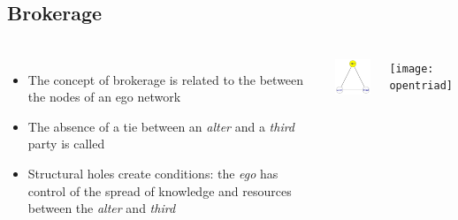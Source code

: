 \documentclass[8pt]{beamer}
\begin{document}
\subsection{Brokerage}

\begin{frame}
\frametitle{\insertsection}
\framesubtitle{\insertsubsection}

\begin{columns}

\begin{itemize}
\item The concept of brokerage is related to the {\color{blue}{absence of ties}} between the nodes of an ego network
\item The absence of a tie between an \textit{alter} and a \textit{third} party is called {\color{blue}{structural hole}}
\item Structural holes create {\color{blue}{tertius gaudens}} conditions: the \textit{ego} has control of the spread of knowledge and resources between the \textit{alter} and \textit{third}
\end{itemize}

\centering
\includegraphics[width=2.5cm]{closedtriad}

\medskip

\texttt{[image: opentriad]}

\end{columns}

\end{frame}

\end{document}
